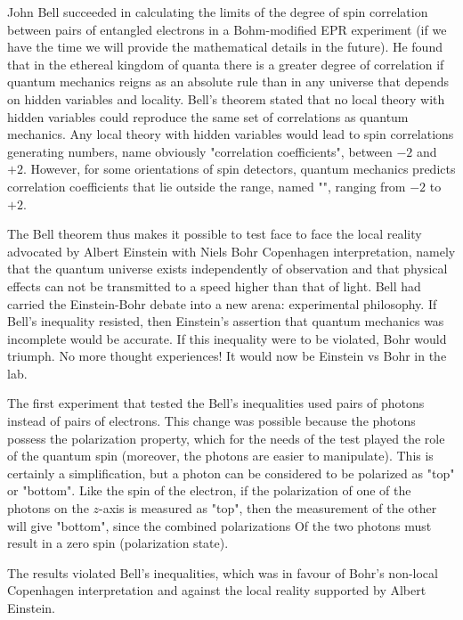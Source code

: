 	John Bell succeeded in calculating the limits of the degree of spin correlation between pairs of entangled electrons in a Bohm-modified EPR experiment (if we have the time we will provide the mathematical details in the future). He found that in the ethereal kingdom of quanta there is a greater degree of correlation if quantum mechanics reigns as an absolute rule than in any universe that depends on hidden variables and locality. Bell's theorem stated that no local theory with hidden variables could reproduce the same set of correlations as quantum mechanics. Any local theory with hidden variables would lead to spin correlations generating numbers, name obviously "correlation coefficients", between $-2$ and $+2$. However, for some orientations of spin detectors, quantum mechanics predicts correlation coefficients that lie outside the range, named "", ranging from $-2$ to $+2$.

	The Bell theorem thus makes it possible to test face to face the local reality advocated by Albert Einstein with Niels Bohr Copenhagen interpretation, namely that the quantum universe exists independently of observation and that physical effects can not be transmitted to a speed higher than that of light. Bell had carried the Einstein-Bohr debate into a new arena: experimental philosophy. If Bell's inequality resisted, then Einstein's assertion that quantum mechanics was incomplete would be accurate. If this inequality were to be violated, Bohr would triumph. No more thought experiences! It would now be Einstein vs Bohr in the lab.
	
	The first experiment that tested the Bell's inequalities used pairs of photons instead of pairs of electrons. This change was possible because the photons possess the polarization property, which for the needs of the test played the role of the quantum spin (moreover, the photons are easier to manipulate). This is certainly a simplification, but a photon can be considered to be polarized as "top" or "bottom". Like the spin of the electron, if the polarization of one of the photons on the $z$-axis is measured as "top", then the measurement of the other will give "bottom", since the combined polarizations Of the two photons must result in a zero spin (polarization state).
	
	The results violated Bell's inequalities, which was in favour of Bohr's non-local Copenhagen  interpretation and against the local reality supported by Albert Einstein.
	
